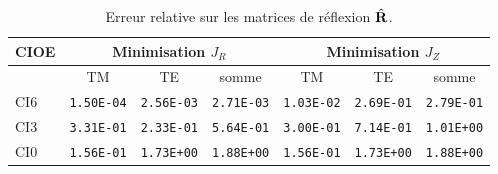   \begin{table}[!hbt]
    \centering
    \begin{tabular}{l|ccc|ccc}
      CIOE & \multicolumn{3}{c}{Minimisation \(J_R\)} & \multicolumn{3}{c}{Minimisation \(J_Z\)}\\
      \hline
      \hline
          & {TM} & {TE} & {somme} & {TM} & {TE} & {somme}\\
      \hline 
      CI6 & \verb|1.50E-04| & \verb|2.56E-03| & \verb|2.71E-03| & \verb|1.03E-02| & \verb|2.69E-01| & \verb|2.79E-01|\\
      CI3 & \verb|3.31E-01| & \verb|2.33E-01| & \verb|5.64E-01| & \verb|3.00E-01| & \verb|7.14E-01| & \verb|1.01E+00|\\
      CI0 & \verb|1.56E-01| & \verb|1.73E+00| & \verb|1.88E+00| & \verb|1.56E-01| & \verb|1.73E+00| & \verb|1.88E+00|  
    \end{tabular}
    \caption{Erreur relative sur les matrices de réflexion \(\hat{\mathbf{R}}\).}
    \label{tab:cylindre:hoppe:62:erreurs_R}
  \end{table}
